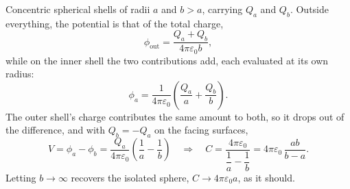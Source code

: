 \begin{example}
Concentric spherical shells of radii $a$ and $b>a$, carrying $Q_a$ and $Q_b$. Outside everything, the potential is that of the total charge,
\[
  \phi_\text{out} = \frac{Q_a + Q_b}{4\pi\varepsilon_0 b},
\]
while on the inner shell the two contributions add, each evaluated at its own radius:
\[
  \phi_a = \frac{1}{4\pi\varepsilon_0}\left(\frac{Q_a}{a} + \frac{Q_b}{b}\right).
\]
The outer shell's charge contributes the same amount to both, so it drops out of the difference, and with $Q_b = -Q_a$ on the facing surfaces,
\[
  V = \phi_a - \phi_b = \frac{Q_a}{4\pi\varepsilon_0}\left(\frac{1}{a} - \frac{1}{b}\right)
  \quad\Longrightarrow\quad
  C = \frac{4\pi\varepsilon_0}{\dfrac{1}{a} - \dfrac{1}{b}} = 4\pi\varepsilon_0\,\frac{ab}{b-a}.
\]
Letting $b\to\infty$ recovers the isolated sphere, $C\to 4\pi\varepsilon_0 a$, as it should.
\end{example}

